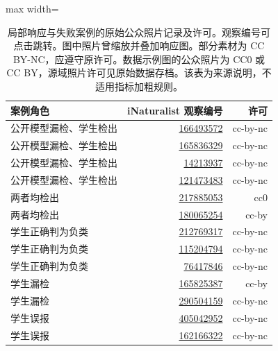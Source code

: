\begin{table}[htbp]
\centering\small
\caption{局部响应与失败案例的原始公众照片记录及许可。观察编号可点击跳转。图中照片曾缩放并叠加响应图。部分素材为 CC BY-NC，应遵守原许可。数据示例图的公众照片为 CC0 或 CC BY，源域照片许可见原始数据存档。该表为来源说明，不适用指标加粗规则。}
\label{tab:credits}
\begin{adjustbox}{max width=\linewidth}
\begin{tabular}{lrr}
\toprule
案例角色 & iNaturalist 观察编号 & 许可\\
\midrule
公开模型漏检、学生检出 & \href{https://inaturalist.org/observations/166493572}{166493572} & cc-by-nc\\
公开模型漏检、学生检出 & \href{https://inaturalist.org/observations/165836329}{165836329} & cc-by-nc\\
公开模型漏检、学生检出 & \href{https://inaturalist.org/observations/14213937}{14213937} & cc-by-nc\\
公开模型漏检、学生检出 & \href{https://inaturalist.org/observations/121473483}{121473483} & cc-by-nc\\
两者均检出 & \href{https://inaturalist.org/observations/217885053}{217885053} & cc0\\
两者均检出 & \href{https://inaturalist.org/observations/180065254}{180065254} & cc-by\\
学生正确判为负类 & \href{https://inaturalist.org/observations/212769317}{212769317} & cc-by-nc\\
学生正确判为负类 & \href{https://inaturalist.org/observations/115204794}{115204794} & cc-by-nc\\
学生正确判为负类 & \href{https://inaturalist.org/observations/76417846}{76417846} & cc-by-nc\\
学生漏检 & \href{https://inaturalist.org/observations/165825387}{165825387} & cc-by\\
学生漏检 & \href{https://inaturalist.org/observations/290504159}{290504159} & cc-by-nc\\
学生误报 & \href{https://inaturalist.org/observations/405042952}{405042952} & cc-by-nc\\
学生误报 & \href{https://inaturalist.org/observations/162166322}{162166322} & cc-by-nc\\
\bottomrule
\end{tabular}
\end{adjustbox}
\end{table}
